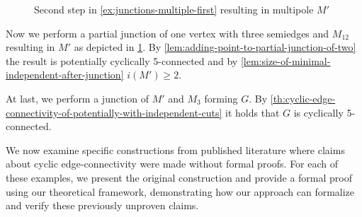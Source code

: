 \documentclass[12pt, twoside]{book}
\begin{document}
\begin{example}
\begin{figure}
		\caption{Second step in \cref{ex:junctions-multiple-first} resulting in multipole $M'$}
		\label{fig:3-5-poles-connected-step-2}
	\end{figure}
	
	Now we perform a partial junction of one vertex with three semiedges and $M_{12}$ resulting in $M'$ as depicted in \cref{fig:3-5-poles-connected-step-2}. By \cref{lem:adding-point-to-partial-junction-of-two} the result is potentially cyclically 5-connected and by \cref{lem:size-of-minimal-independent-after-junction} $i(M')\geq 2$.
	
	At last, we perform a junction of $M'$ and $M_3$ forming $G$. By \cref{th:cyclic-edge-connectivity-of-potentially-with-independent-cuts} it holds that $G$ is cyclically 5-connected.
\end{example}

We now examine specific constructions from published literature where claims about cyclic edge-connectivity were made without formal proofs. For each of these examples, we present the original construction and provide a formal proof using our theoretical framework, demonstrating how our approach can formalize and verify these previously unproven claims.
\end{document}
